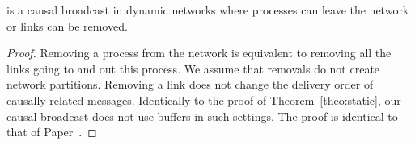 \begin{lemma}
  \CBROADCAST is a causal broadcast in dynamic networks where processes can
  leave the network or links can be removed.
\end{lemma}

\begin{proof}
  Removing a process from the network is equivalent to removing all the links
  going to and out this process. We assume that removals do not create network
  partitions.  Removing a link does not change the delivery order of causally
  related messages. Identically to the proof of Theorem~\ref{theo:static}, our
  causal broadcast does not use buffers in such settings. The proof is identical
  to that of Paper~\cite{friedman2004causal}.
\end{proof}


%     

%     






